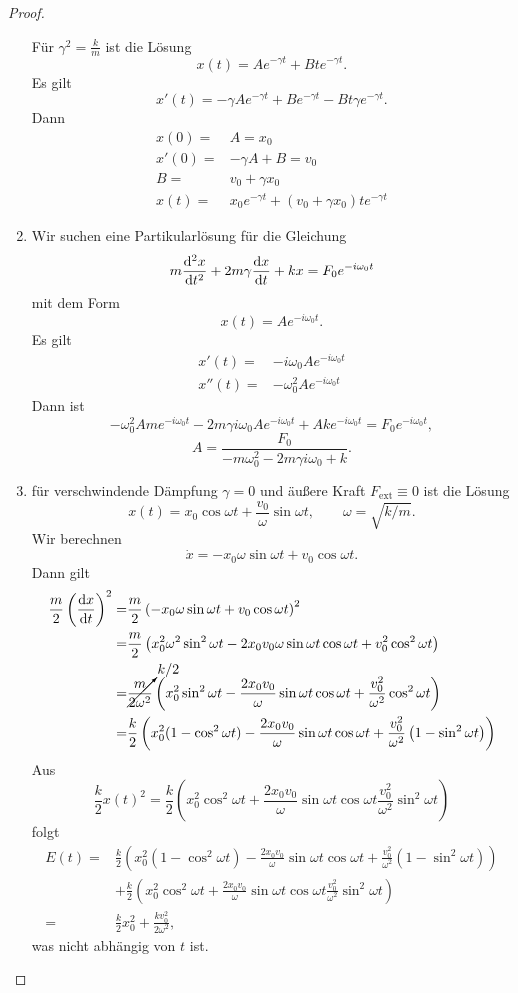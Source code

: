 \documentclass[prb,12pt]{revtex4-2}
\theoremstyle{definition}
\theoremstyle{definition}
\begin{document}
\begin{proof}
\begin{enumerate}
F\"{u}r $\gamma^2=\frac{k}{m}$ ist die L\"{o}sung
\[
	x(t)=Ae^{-\gamma t}+Bte^{-\gamma t}
.\] 
Es gilt
\[
	x'(t)=-\gamma Ae^{-\gamma t}+Be^{-\gamma t}-Bt\gamma e^{-\gamma t}
.\]
Dann
\begin{align*}
	x(0)=& A=x_0\\
	x'(0)=& -\gamma A+B=v_0\\
	B=& v_0+\gamma x_0\\
	x(t)=& x_0e^{-\gamma t}+(v_0+\gamma x_0)te^{-\gamma t}
\end{align*}
\item Wir suchen eine Partikularl\"{o}sung f\"{u}r die Gleichung
	\[
		m\dv[2]{x}{t}+2m\gamma\dv{x}{t}+kx=F_0e^{-i\omega_0t}
	\]
	mit dem Form
	\[
		x(t)=Ae^{-i\omega_0t}
	.\] 
	Es gilt
	\begin{align*}
		x'(t)=&-i\omega_0 Ae^{-i\omega_0 t} \\
		x''(t)=&-\omega_0^2 Ae^{-i\omega_0 t}
	\end{align*}
	Dann ist
	\[
		-\omega_0^2 Ame^{-i\omega_0t}-2m\gamma i\omega_0 Ae^{-i\omega_0 t}+Ake^{-i\omega_0 t}=F_0e^{-i\omega_0t}
	,\]
	\[
	A=\frac{F_0}{-m\omega_0^2-2m\gamma i\omega_0+k}
	.\] 
\item für verschwindende Dämpfung $\gamma = 0$ und äußere Kraft $F_\text{ext} \equiv 0$ ist die L\"{o}sung
	\[
	x(t)=x_0\cos\omega t+\frac{v_0}{\omega}\sin\omega t, \qquad \omega=\sqrt{k / m} 
	.\] 
	Wir berechnen
	\[
		\dot{x}=-x_0\omega\sin\omega t +v_0\cos\omega t
	.\] 
	Dann gilt
\begin{align*}
	\frac{m}{2}\left( \dv{x}{t} \right) ^2 =& \frac{m}{2}\left( -x_0\omega\sin\omega t+v_0\cos\omega t \right) ^2\\
	=& \frac{m}{2}\left( x_0^2\omega^2\sin^2\omega t-2x_0v_0\omega \sin\omega t\cos\omega t+v_0^2\cos^2\omega t \right)\\
	=& \cancelto{k / 2}{\frac{m}{2\omega^2}}\left( x_0^2\sin^2\omega t-\frac{2x_0v_0}{\omega}\sin\omega t\cos\omega t+\frac{v_0^2}{\omega^2}\cos^2\omega t\right)\\
	=& \frac{k}{2}\left( x_0^2(1-\cos^2\omega t)-\frac{2x_0v_0}{\omega}\sin\omega t\cos\omega t+\frac{v_0^2}{\omega^2}\left( 1-\sin^2\omega t \right)  \right) 
\end{align*}
Aus
\[
\frac{k}{2}x(t)^2=\frac{k}{2}\left( x_0^2\cos^2\omega t+\frac{2x_0v_0}{\omega}\sin\omega t\cos\omega t\frac{v_0^2}{\omega^2}\sin^2\omega t \right) 
\]
folgt
\begin{align*}
	E(t)=& \frac{k}{2}\left( x_0^2(1-\cos^2\omega t)-\frac{2x_0v_0}{\omega}\sin\omega t\cos\omega t+\frac{v_0^2}{\omega^2}\left( 1-\sin^2\omega t \right)  \right) \\
	     &+\frac{k}{2}\left( x_0^2\cos^2\omega t+\frac{2x_0v_0}{\omega}\sin\omega t\cos\omega t\frac{v_0^2}{\omega^2}\sin^2\omega t \right)\\ 
	=&\frac{k}{2}x_0^2+\frac{kv_0^2}{2\omega^2},
\end{align*}
was nicht abhängig von $t$ ist.


\end{enumerate}
\end{proof}
\end{document}
